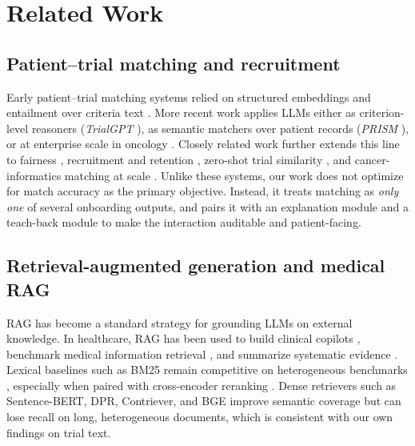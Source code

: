 \documentclass[11pt]{article}
\begin{document}
\section{Related Work}
\label{sec:related}

\subsection{Patient--trial matching and recruitment}
Early patient--trial matching systems relied on structured embeddings and entailment over criteria text \citep{zhang2020deepenroll,gao2020compose,bustos2018trial}. More recent work applies LLMs either as criterion-level reasoners (\emph{TrialGPT} \citep{jin2024trialgpt}), as semantic matchers over patient records (\emph{PRISM} \citep{gupta2024prism}), or at enterprise scale in oncology \citep{wong2024scaling,nievas2024distilling}. Closely related work further extends this line to fairness \citep{chang2024fair}, recruitment and retention \citep{lu2024airecruit,unger2019recruitment,clark2019barriers}, zero-shot trial similarity \citep{wang2023trial2vec}, and cancer-informatics matching at scale \citep{chen2025enhancing}. Unlike these systems, our work does not optimize for match accuracy as the primary objective. Instead, it treats matching as \emph{only one} of several onboarding outputs, and pairs it with an explanation module and a teach-back module to make the interaction auditable and patient-facing.

\subsection{Retrieval-augmented generation and medical RAG}
RAG \citep{lewis2020rag,guu2020realm,karpukhin2020dpr,izacard2022contriever,reimers2019sbert,thakur2021beir} has become a standard strategy for grounding LLMs on external knowledge. In healthcare, RAG has been used to build clinical copilots \citep{zhao2025medrag}, benchmark medical information retrieval \citep{xiong2024benchmarking}, and summarize systematic evidence \citep{neha2025ragsystematic,maity2025llmhealth}. Lexical baselines such as \textsc{BM25} \citep{robertson2009bm25} remain competitive on heterogeneous benchmarks \citep{thakur2021beir,lin2021pyserini}, especially when paired with cross-encoder reranking \citep{nogueira2019passage,khattab2020colbert,hofstatter2021crossenc,wang2020minilm}. Dense retrievers such as Sentence-BERT, DPR, Contriever, and BGE \citep{reimers2019sbert,karpukhin2020dpr,izacard2022contriever,xiao2024bge} improve semantic coverage but can lose recall on long, heterogeneous documents, which is consistent with our own findings on trial text.
\end{document}
